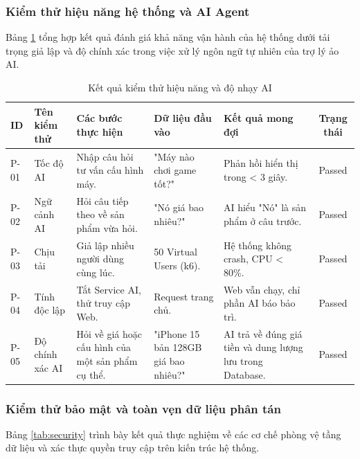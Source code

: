 \subsubsection{Kiểm thử hiệu năng hệ thống và AI Agent}

Bảng \ref{tab:performance} tổng hợp kết quả đánh giá khả năng vận hành của hệ thống dưới tải trọng giả lập và độ chính xác trong việc xử lý ngôn ngữ tự nhiên của trợ lý ảo AI.

\begin{table}[H]
\centering
\caption{Kết quả kiểm thử hiệu năng và độ nhạy AI}
\label{tab:performance}
\small
\begin{tabularx}{\textwidth}{|l|X|X|X|X|c|}
\hline
\textbf{ID} & \textbf{Tên kiểm thử} & \textbf{Các bước thực hiện} & \textbf{Dữ liệu đầu vào} & \textbf{Kết quả mong đợi} & \textbf{Trạng thái} \\ \hline
P-01 & Tốc độ AI & Nhập câu hỏi tư vấn cấu hình máy. & "Máy nào chơi game tốt?" & Phản hồi hiển thị trong < 3 giây. & Passed \\ \hline
P-02 & Ngữ cảnh AI & Hỏi câu tiếp theo về sản phẩm vừa hỏi. & "Nó giá bao nhiêu?" & AI hiểu "Nó" là sản phẩm ở câu trước. & Passed \\ \hline
P-03 & Chịu tải & Giả lập nhiều người dùng cùng lúc. & 50 Virtual Users (k6). & Hệ thống không crash, CPU < 80\%. & Passed \\ \hline
P-04 & Tính độc lập & Tắt Service AI, thử truy cập Web. & Request trang chủ. & Web vẫn chạy, chỉ phần AI báo bảo trì. & Passed \\ \hline
P-05 & Độ chính xác AI & Hỏi về giá hoặc cấu hình của một sản phẩm cụ thể. & "iPhone 15 bản 128GB giá bao nhiêu?" & AI trả về đúng giá tiền và dung lượng lưu trong Database. & Passed \\ \hline
\end{tabularx}
\end{table}

\subsubsection{Kiểm thử bảo mật và toàn vẹn dữ liệu phân tán}

Bảng \ref{tab:security} trình bày kết quả thực nghiệm về các cơ chế phòng vệ tầng dữ liệu và xác thực quyền truy cập trên kiến trúc hệ thống.

